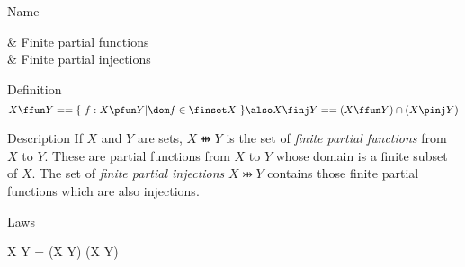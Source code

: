 \begin{manpage}\label{p:3060}
\item[Name]
\begin{name}
     \ffun & Finite partial functions%
		\symdex{$\ffun$} \\
     \finj & Finite partial injections%
		\symdex{$\finj$}
\end{name}

\item[Definition]
\[
     X \ffun Y  ==  \{~f: X \pfun Y | \dom f \in \finset X~\}
\also
     X \finj Y  ==  (X \ffun Y) \cap (X \pinj Y)
\]

\item[Description]
If $X$ and $Y$ are sets, $X \ffun Y$ is the set of {\em finite
partial functions\/} from $X$ to $Y$. These are partial functions
from $X$ to $Y$ whose domain is a finite subset of $X$. The set
of {\em finite partial injections\/} $X \finj Y$ contains those
finite partial functions which are also injections.

\item[Laws]
\begin{laws}
        X \ffun Y = (X \pfun Y) \cap \finset (X \cross Y)
\end{laws}
\end{manpage}
